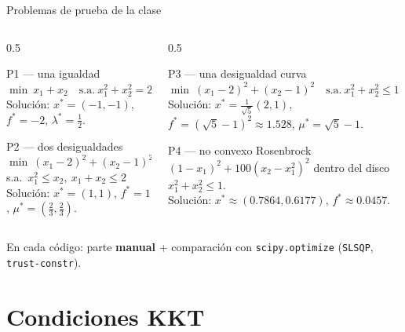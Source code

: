 \documentclass[aspectratio=169]{beamer}
\newcommand{\xs}{x^\ast}
\begin{document}
\begin{frame}{Problemas de prueba de la clase}
  \small
  \begin{columns}[T]
    \begin{column}{0.5\textwidth}
      \begin{block}{P1 --- una igualdad}
        $\min\ x_1+x_2\quad\text{s.a.}\ x_1^2+x_2^2=2$\\[2pt]
        Solución: $\xs=(-1,-1)$, $f^\ast=-2$, $\lambda^\ast=\tfrac12$.
      \end{block}
      \begin{block}{P2 --- dos desigualdades}
        $\min\ (x_1-2)^2+(x_2-1)^2$\\ s.a.\ $x_1^2\le x_2,\ x_1+x_2\le 2$\\[2pt]
        Solución: $\xs=(1,1)$, $f^\ast=1$, $\mu^\ast=(\tfrac23,\tfrac23)$.
      \end{block}
    \end{column}
    \begin{column}{0.5\textwidth}
      \begin{block}{P3 --- una desigualdad curva}
        $\min\ (x_1-2)^2+(x_2-1)^2\quad\text{s.a.}\ x_1^2+x_2^2\le 1$\\[2pt]
        Solución: $\xs=\tfrac{1}{\sqrt5}(2,1)$, $f^\ast=(\sqrt5-1)^2\approx1.528$, $\mu^\ast=\sqrt5-1$.
      \end{block}
      \begin{block}{P4 --- no convexo}
        Rosenbrock $(1-x_1)^2+100(x_2-x_1^2)^2$ dentro del disco $x_1^2+x_2^2\le1$.\\[2pt]
        Solución: $\xs\approx(0.7864,0.6177)$, $f^\ast\approx0.0457$.
      \end{block}
    \end{column}
  \end{columns}
  \vspace{0.2cm}
  \centering En cada código: parte \textbf{manual} + comparación con \texttt{scipy.optimize} (\texttt{SLSQP}, \texttt{trust-constr}).
\end{frame}
\section{Condiciones KKT}
\end{document}
